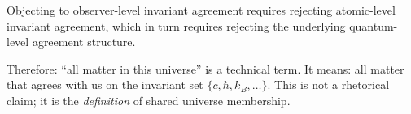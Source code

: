 \begin{corollary}\label{cor:ego-trap}
Objecting to observer-level invariant agreement requires rejecting atomic-level
invariant agreement, which in turn requires rejecting the underlying quantum-level agreement structure.
\end{corollary}

Therefore: ``all matter in this universe'' is a technical term. It means:
all matter that agrees with us on the invariant set $\{c, \hbar, k_B, \ldots\}$.
This is not a rhetorical claim; it is the \emph{definition} of shared universe membership.
